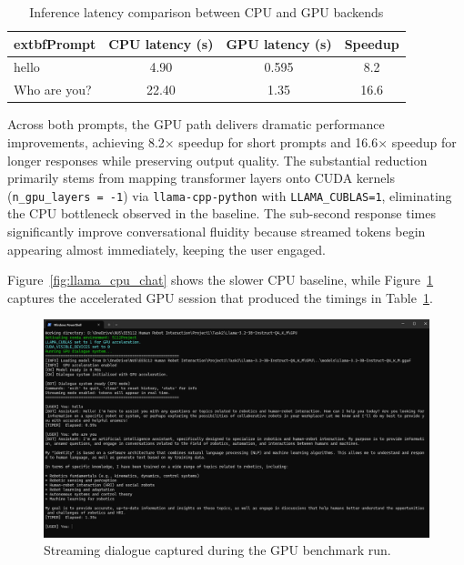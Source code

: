 \documentclass[12pt,a4paper]{article}
\begin{document}
\begin{table}[H]
    \centering
    \caption{Inference latency comparison between CPU and GPU backends}
    \label{tab:cpu_gpu_latency}
    \begin{tabular}{|l|c|c|c|}
        \hline
        	extbf{Prompt} & \textbf{CPU latency (s)} & \textbf{GPU latency (s)} & \textbf{Speedup} \\
        \hline
        hello & 4.90 & 0.595 & 8.2\texttimes{} \\
        Who are you? & 22.40 & 1.35 & 16.6\texttimes{} \\
        \hline
    \end{tabular}
\end{table}

Across both prompts, the GPU path delivers dramatic performance improvements, achieving 8.2× speedup for short prompts and 16.6× speedup for longer responses while preserving output quality. The substantial reduction primarily stems from mapping transformer layers onto CUDA kernels (\texttt{n\_gpu\_layers = -1}) via \texttt{llama-cpp-python} with \texttt{LLAMA\_CUBLAS=1}, eliminating the CPU bottleneck observed in the baseline. The sub-second response times significantly improve conversational fluidity because streamed tokens begin appearing almost immediately, keeping the user engaged.

Figure~\ref{fig:llama_cpu_chat} shows the slower CPU baseline, while Figure~\ref{fig:llama_gpu_chat} captures the accelerated GPU session that produced the timings in Table~\ref{tab:cpu_gpu_latency}.

\begin{figure}[H]
    \centering
    \includegraphics[width=1\linewidth]{Figures/llamaGPU.png}
    \caption{Streaming dialogue captured during the GPU benchmark run.}
    \label{fig:llama_gpu_chat}
\end{figure}
\end{document}
